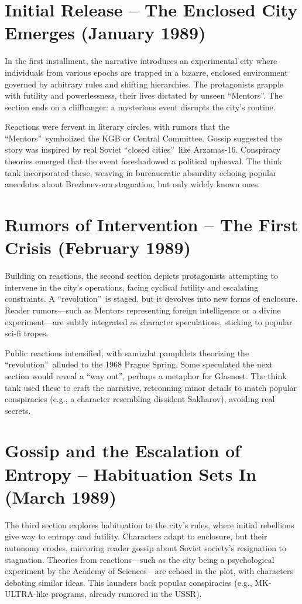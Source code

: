 \documentclass[openany]{book}
\begin{document}
\section{Initial Release – The Enclosed City Emerges (January 1989)}
In the first installment, the narrative introduces an experimental city where individuals from various epochs are trapped in a bizarre, enclosed environment governed by arbitrary rules and shifting hierarchies. The protagonists grapple with futility and powerlessness, their lives dictated by unseen \textquotedblleft Mentors\textquotedblright. The section ends on a cliffhanger: a mysterious event disrupts the city's routine.

Reactions were fervent in literary circles, with rumors that the \textquotedblleft Mentors\textquotedblright\ symbolized the KGB or Central Committee. Gossip suggested the story was inspired by real Soviet \textquotedblleft closed cities\textquotedblright\ like Arzamas-16. Conspiracy theories emerged that the event foreshadowed a political upheaval. The think tank incorporated these, weaving in bureaucratic absurdity echoing popular anecdotes about Brezhnev-era stagnation, but only widely known ones.

\section{Rumors of Intervention – The First Crisis (February 1989)}
Building on reactions, the second section depicts protagonists attempting to intervene in the city's operations, facing cyclical futility and escalating constraints. A \textquotedblleft revolution\textquotedblright\ is staged, but it devolves into new forms of enclosure. Reader rumors---such as Mentors representing foreign intelligence or a divine experiment---are subtly integrated as character speculations, sticking to popular sci-fi tropes.

Public reactions intensified, with samizdat pamphlets theorizing the \textquotedblleft revolution\textquotedblright\ alluded to the 1968 Prague Spring. Some speculated the next section would reveal a \textquotedblleft way out\textquotedblright, perhaps a metaphor for Glasnost. The think tank used these to craft the narrative, retconning minor details to match popular conspiracies (e.g., a character resembling dissident Sakharov), avoiding real secrets.

\section{Gossip and the Escalation of Entropy – Habituation Sets In (March 1989)}
The third section explores habituation to the city's rules, where initial rebellions give way to entropy and futility. Characters adapt to enclosure, but their autonomy erodes, mirroring reader gossip about Soviet society's resignation to stagnation. Theories from reactions---such as the city being a psychological experiment by the Academy of Sciences---are echoed in the plot, with characters debating similar ideas. This launders back popular conspiracies (e.g., MK-ULTRA-like programs, already rumored in the USSR).
\end{document}
